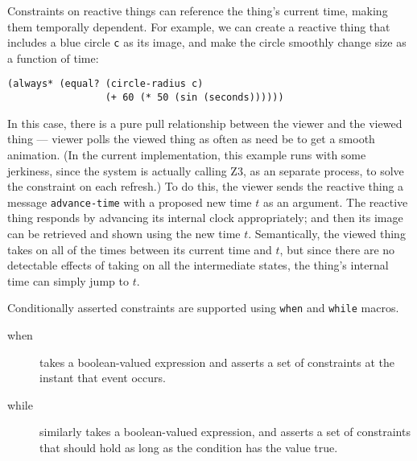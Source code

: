 \documentclass[reprint]{sigplanconf}
\begin{document}
Constraints on reactive things can reference the thing's current time,
making them temporally dependent.  For example, we can create a reactive
thing that includes a blue circle \verb|c| as its image, and make the
circle smoothly change size as a function of time:

\begin{verbatim}
(always* (equal? (circle-radius c)
                 (+ 60 (* 50 (sin (seconds))))))
\end{verbatim}

In this case, there is a pure pull relationship between the viewer and
the viewed thing --- viewer polls the viewed thing as often as need be to
get a smooth animation.  (In the current implementation, this example runs
with some jerkiness, since the system is actually calling Z3, as an
separate process, to solve the constraint on each refresh.)  To do this,
the viewer sends the reactive thing a message \verb|advance-time| with a
proposed new time $t$ as an argument.  The reactive thing responds by
advancing its internal clock appropriately; and then its image can be
retrieved and shown using the new time $t$\@.  Semantically, the viewed
thing takes on all of the times between its current time and $t$, but since
there are no detectable effects of taking on all the intermediate states,
the thing's internal time can simply jump to $t$.

Conditionally asserted constraints are supported using \verb|when| and
\verb|while| macros.

\begin{description}
    
\item[when] takes a boolean-valued expression and asserts a set of
  constraints at the instant that event occurs.

\item[while] similarly takes a boolean-valued expression, and asserts a set
  of constraints that should hold as long as the condition has the value
  true.



\end{description}
\end{document}
